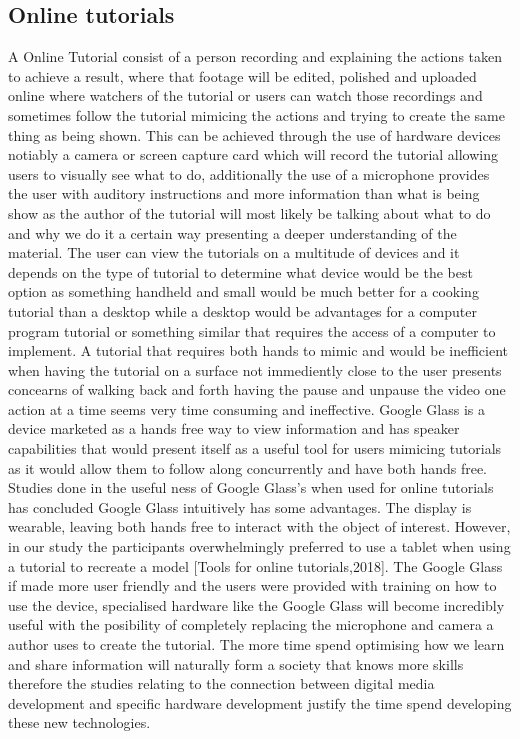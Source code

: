 \documentclass[12pt, times new roman]{article}
\begin{document}
\subsection{Online tutorials}
A Online Tutorial consist of a person recording and explaining the actions taken to achieve a result, where that footage will be edited, polished and uploaded online where watchers of the tutorial or users can watch those recordings and sometimes follow the tutorial mimicing the actions and trying to create the same thing as being shown. This can be achieved through the use of hardware devices notiably a camera or screen capture card which will record the tutorial allowing users to visually see what to do, additionally the use of a microphone provides the user with auditory instructions and more information than what is being show as the author of the tutorial will most likely be talking about what to do and why we do it a certain way presenting a deeper understanding of the material. The user can view the tutorials on a multitude of devices and it depends on the type of tutorial to determine what device would be the best option as something handheld and small would be much better for a cooking tutorial than a desktop while a desktop would be advantages for a computer program tutorial or something similar that requires the access of a computer to implement.  \newline 
A tutorial that requires both hands to mimic and would be inefficient when having the tutorial on a surface not immediently close to the user presents concearns of walking back and forth having the pause and unpause the video one action at a time seems very time consuming and ineffective. Google Glass is a device marketed as a hands free way to view information and has speaker capabilities that would present itself as a useful tool for users mimicing tutorials as it would allow them to follow along concurrently and have both hands free. Studies done in the useful ness of Google Glass's when used for online tutorials has concluded Google Glass intuitively has some advantages. The display is wearable, leaving both hands free to interact with the object of interest. However, in our study the participants overwhelmingly preferred to use a tablet when using a tutorial to recreate a model [Tools for online tutorials,2018]. The Google Glass if made more user friendly and the users were provided with training on how to use the device, specialised hardware like the Google Glass will become incredibly useful with the posibility of completely replacing the microphone and camera a author uses to create the tutorial. The more time spend optimising how we learn and share information will naturally form a society that knows more skills therefore the studies relating to the connection between digital media development and specific hardware development justify the time spend developing these new technologies.  \newline
\newline
\end{document}
